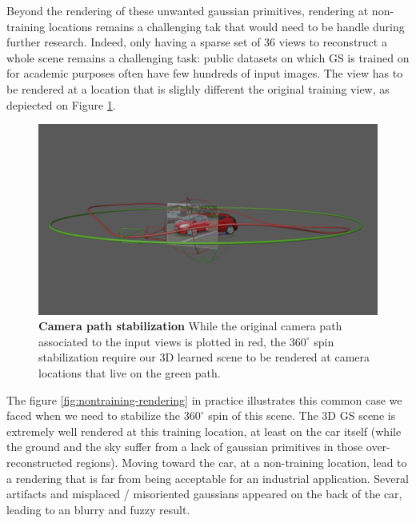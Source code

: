 Beyond the rendering of these unwanted gaussian primitives, rendering at non-training locations remains a challenging tak that would need to be handle during further research. Indeed, only having a sparse set of 36 views to reconstruct a whole scene remains a challenging task: public datasets on which \ac{GS} is trained on for academic purposes often have few hundreds of input images. The view has to be rendered at a location that is slighly different the original training view, as depiected on Figure \ref{fig:theory-camera-path}. 

\begin{figure}[htb!]
  \center
\includegraphics[width=\linewidth]{images/gaussiansplatting/theory-camera-path.png}
\caption{\textbf{Camera path stabilization} While the original camera path associated to the input views is plotted in red, the $360^{\circ}$ spin stabilization require our 3D learned scene to be rendered at camera locations that live on the green path.}
\label{fig:theory-camera-path}
\end{figure}

The figure \ref{fig:nontraining-rendering} in practice illustrates this common case we faced when we need to stabilize the $360^{\circ}$ spin of this scene. The 3D \ac{GS} scene is extremely well rendered at this training location, at least on the car itself (while the ground and the sky suffer from a lack of gaussian primitives in those over-reconstructed regions). Moving toward the car, at a non-training location, lead to a rendering that is far from being acceptable for an industrial application. Several artifacts and misplaced / misoriented gaussians appeared on the back of the car, leading to an blurry and fuzzy result. 


